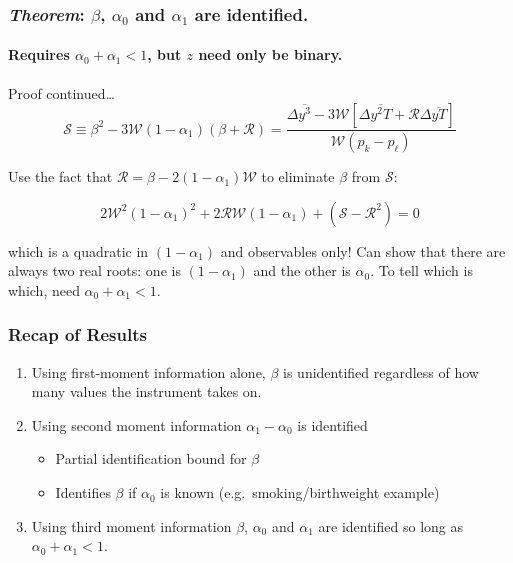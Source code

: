 \documentclass{beamer}
\begin{document}
\begin{frame}
  \frametitle{\emph{Theorem}: $\beta$, $\alpha_0$ and $\alpha_1$ are identified.}
  \framesubtitle{Requires $\alpha_0 + \alpha_1 < 1$, but $z$ need only be binary.}
  \begin{block}{Proof continued\dots}
    \vspace{-1em}
  \begin{equation*}
    \mathcal{S} \equiv \beta^2 - 3\mathcal{W}(1-\alpha_1) (\beta + \mathcal{R}) = \frac{\Delta\overline{y^3} - 3 \mathcal{W}\left[ \Delta\overline{y^2T}+\mathcal{R}\Delta\overline{yT} \right]}{\mathcal{W}(p_k - p_\ell)}
  \end{equation*}
  \vspace{1em}

  Use the fact that $\mathcal{R}=\beta - 2(1-\alpha_1)\mathcal{W}$ to eliminate $\beta$ from $\mathcal{S}$:

  \begin{equation*}
    2\mathcal{W}^2 (1-\alpha_1)^2 + 2 \mathcal{R}\mathcal{W} (1-\alpha_1) + (\mathcal{S} -\mathcal{R}^2) = 0
    \label{eq:quadratic}
  \end{equation*}

  which is a quadratic in $(1-\alpha_1)$ and observables only! Can show that there are always two real roots: one is $(1-\alpha_1)$ and the other is $\alpha_0$. To tell which is which, need $\alpha_0 + \alpha_1 < 1$.
  \end{block}
\end{frame}
\begin{frame}
  \frametitle{Recap of Results}
  \begin{enumerate}
    \item Using first-moment information alone, $\beta$ is unidentified regardless of how many values the instrument takes on.
     \item Using second moment information $\alpha_1 - \alpha_0$ is identified
       \begin{itemize}
         \item Partial identification bound for $\beta$
          \item Identifies $\beta$ if $\alpha_0$ is known (e.g.\ smoking/birthweight example)
       \end{itemize}
    \item Using third moment information $\beta$, $\alpha_0$ and $\alpha_1$ are identified so long as $\alpha_0 + \alpha_1 < 1$.
  \end{enumerate}
\end{frame}
\end{document}
